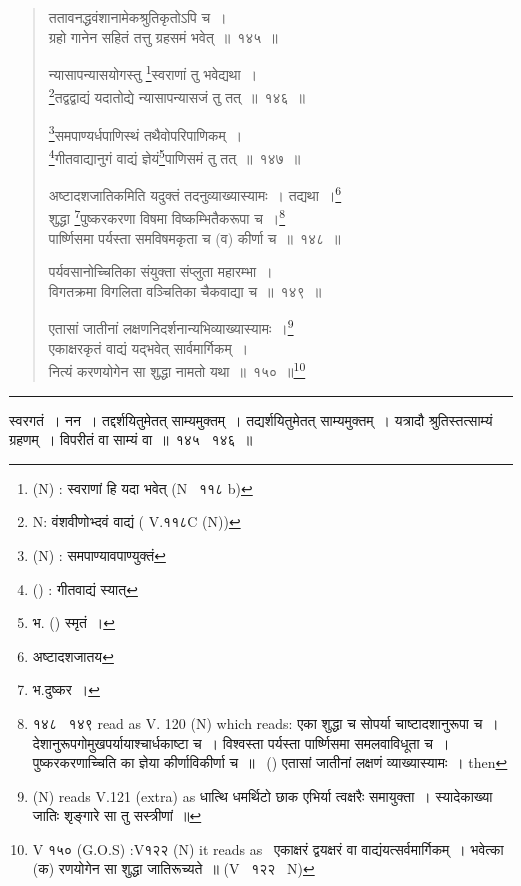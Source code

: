 \documentclass[11pt, openany]{book}
\begin{document}
\begin{quote}
{\na ततावनद्धवंशानामेकश्रुतिकृतोऽपि च~।\\
ग्रहो गानेन सहितं तत्तु ग्रहसमं भवेत्~॥~१४५~॥

न्यासापन्यासयोगस्तु \renewcommand{\thefootnote}{1a}\footnote{(N) : स्वराणां हि यदा भवेत् (N \textendash\ ११८ b)}स्वराणां तु भवेद्यथा~।\\
\renewcommand{\thefootnote}{1b}\footnote{N: वंशवीणोभ्दवं वाद्यं ( V.११८C (N))}तद्वद्वाद्यं यदातोद्ये न्यासापन्यासजं तु तत्~॥~१४६~॥

\renewcommand{\thefootnote}{1c}\footnote{(N) : समपाण्यावपाण्युक्तं}समपाण्यर्धपाणिस्थं तथैवोपरिपाणिकम्~।\\
\renewcommand{\thefootnote}{1d}\footnote{() : गीतवाद्यं स्यात्}गीतवाद्यानुगं वाद्यं ज्ञेयं\renewcommand{\thefootnote}{1e}\footnote{भ. () स्मृतं~।}पाणिसमं तु तत्~॥~१४७~॥

अष्टादशजातिकमिति यदुक्तं तदनुव्याख्यास्यामः~। तद्यथा~।\renewcommand{\thefootnote}{1}\footnote{अष्टादशजातय}\\
शुद्धा \renewcommand{\thefootnote}{2}\footnote{भ.दुष्कर~।}पुष्करकरणा विषमा विष्कम्भितैकरूपा च~।\renewcommand{\thefootnote}{2a}\footnote{१४८  \textendash\ १४९ read as V. 120 (N) which reads: एका शुद्धा च सोपर्या चाष्टादशानुरूपा च~। देशानुरूपगोमुखपर्यायाश्चार्धकाष्टा च~। विश्वस्ता पर्यस्ता पार्ष्णिसमा समलवाविधूता च~। पुष्करकरणाच्चिति का ज्ञेया कीर्णाविकीर्णा च~॥~ () एतासां जातीनां लक्षणं व्याख्यास्यामः~। then}\\
पार्ष्णिसमा पर्यस्ता समविषमकृता च (व) कीर्णा च~॥~१४८~॥

पर्यवसानोच्चितिका संयुक्ता संप्लुता महारम्भा~।\\
विगतक्रमा विगलिता वञ्चितिका चैकवाद्या च~॥~१४९~॥

एतासां जातीनां लक्षणनिदर्शनान्यभिव्याख्यास्यामः~।\renewcommand{\thefootnote}{3}\footnote{(N) reads V.121 (extra) as धात्थि धमर्थिटो छाक एभिर्या त्वक्षरैः समायुक्ता~। स्यादेकाख्या जातिः शृङ्गारे सा तु सस्त्रीणां~॥}\\
एकाक्षरकृतं वाद्यं यद्भवेत् सार्वमार्गिकम्~।\\
नित्यं करणयोगेन सा शुद्धा नामतो यथा~॥~१५०~॥\renewcommand{\thefootnote}{4}\footnote{V १५० (G.O.S) :V१२२ (N) it reads as  \textendash\  एकाक्षरं द्वयक्षरं वा वाद्यंयत्सर्वमार्गिकम्~। भवेत्का (क) रणयोगेन सा शुद्धा जातिरूच्यते~॥  (V \textendash\ १२२ \textendash\ N)}}
\end{quote}
 
\hrule

\vspace{2mm}
{\qtt स्वरगतं}~। नन~। तद्दर्शयितुमेतत् साम्यमुक्तम्~। तद्यर्शयितुमेतत् साम्यमुक्तम्~। यत्रादौ श्रुतिस्तत्साम्यं ग्रहणम्~। विपरीतं वा साम्यं वा~॥~१४५ \textendash\ १४६~॥\\
\end{document}
